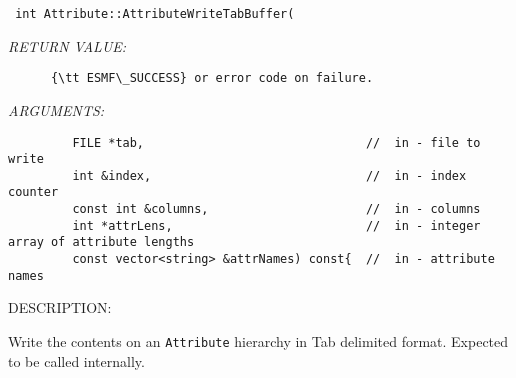 \begin{verbatim} int Attribute::AttributeWriteTabBuffer(\end{verbatim}{\em RETURN VALUE:}
\begin{verbatim}      {\tt ESMF\_SUCCESS} or error code on failure.\end{verbatim}{\em ARGUMENTS:}
\begin{verbatim}         FILE *tab,                               //  in - file to write
         int &index,                              //  in - index counter
         const int &columns,                      //  in - columns
         int *attrLens,                           //  in - integer array of attribute lengths
         const vector<string> &attrNames) const{  //  in - attribute names\end{verbatim}
{\sf DESCRIPTION:\\ }


      Write the contents on an {\tt Attribute} hierarchy in Tab delimited format.
      Expected to be called internally.
  
\setlength{\parskip}{\oldparskip}
\setlength{\parindent}{\oldparindent}
\setlength{\baselineskip}{\oldbaselineskip}

